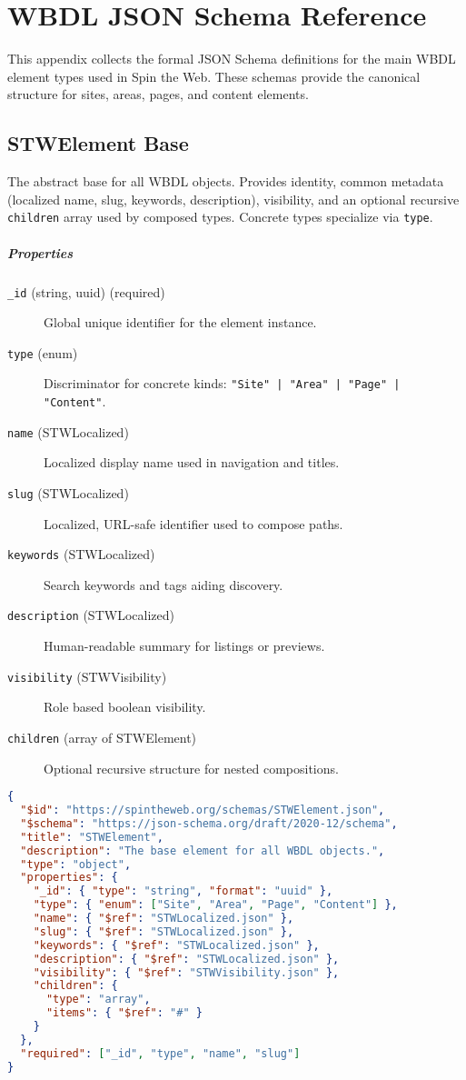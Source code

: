 
\chapter{WBDL JSON Schema Reference}
\label{app:wbdl-json-schema}

This appendix collects the formal JSON Schema definitions for the main WBDL element types used in Spin the Web. These schemas provide the canonical structure for sites, areas, pages, and content elements.

\section{STWElement Base}
The abstract base for all WBDL objects. Provides identity, common metadata (localized name, slug, keywords, description), visibility, and an optional recursive \texttt{children} array used by composed types. Concrete types specialize via \texttt{type}.
\paragraph{Properties}
\begin{description}
  \item[\texttt{\_id} (string, uuid) (required)] Global unique identifier for the element instance.
  \item[\texttt{type} (enum)] Discriminator for concrete kinds: \texttt{"Site" | "Area" | "Page" | "Content"}.
  \item[\texttt{name} (STWLocalized)] Localized display name used in navigation and titles.
  \item[\texttt{slug} (STWLocalized)] Localized, URL-safe identifier used to compose paths.
  \item[\texttt{keywords} (STWLocalized)] Search keywords and tags aiding discovery.
  \item[\texttt{description} (STWLocalized)] Human-readable summary for listings or previews.
  \item[\texttt{visibility} (STWVisibility)] Role based boolean visibility.
  \item[\texttt{children} (array of STWElement)] Optional recursive structure for nested compositions.
\end{description}
\begin{lstlisting}[language=JSON,caption={STWElement Base Schema Definition}]
{
  "$id": "https://spintheweb.org/schemas/STWElement.json",
  "$schema": "https://json-schema.org/draft/2020-12/schema",
  "title": "STWElement",
  "description": "The base element for all WBDL objects.",
  "type": "object",
  "properties": {
    "_id": { "type": "string", "format": "uuid" },
    "type": { "enum": ["Site", "Area", "Page", "Content"] },
    "name": { "$ref": "STWLocalized.json" },
    "slug": { "$ref": "STWLocalized.json" },
    "keywords": { "$ref": "STWLocalized.json" },
    "description": { "$ref": "STWLocalized.json" },
    "visibility": { "$ref": "STWVisibility.json" },
    "children": {
      "type": "array",
      "items": { "$ref": "#" }
    }
  },
  "required": ["_id", "type", "name", "slug"]
}
\end{lstlisting}

